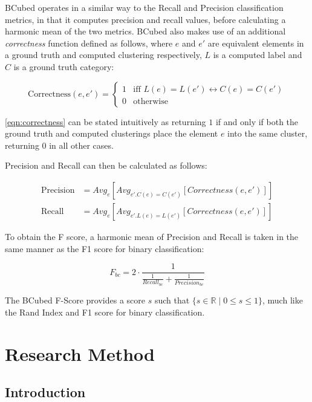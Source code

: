 \documentclass{uvamscse}	%
\begin{document}
	BCubed operates in a similar way to the Recall and Precision classification metrics, in that it computes precision and recall values, before calculating a harmonic mean of the two metrics. BCubed also makes use of an additional \emph{correctness} function defined as follows, where $e$ and $e'$ are equivalent elements in a ground truth and computed clustering respectively, $L$ is a computed label and $C$ is a ground truth category:
	
	\begin{equation}
	\label{eqn:correctness}
	    \text{Correctness}(e,e') = 
	    \begin{cases}
	        1 & \text{iff $L(e) = L(e') \leftrightarrow C(e) = C(e')$}\\
	        0 & \text{otherwise}
	    \end{cases}
	\end{equation}
	
	\autoref{eqn:correctness} can be stated intuitively as returning $1$ if and only if both the ground truth and computed clusterings place the element $e$ into the same cluster, returning $0$ in all other cases.
	
	Precision and Recall can then be calculated as follows:
	
    \begin{align}
    \label{eqn:bcubed-precision}
        \text{Precision} &= Avg_e [Avg_{e' . C(e) = C(e')}[Correctness(e,e')]]\\
        \label{eqn:bcubed-recall}
        \text{Recall} &= Avg_e [Avg_{e' . L(e) = L(e')}[Correctness(e,e')]]
    \end{align}

To obtain the F score, a harmonic mean of Precision and Recall is taken in the same manner as the F1 score for binary classification:

\begin{equation}
    F_{bc} = 2 \cdot \frac{1}{\frac{1}{Recall_{bc}} + \frac{1}{Precision_{bc}}}
\end{equation}

The BCubed F-Score provides a score $s$ such that $ \{s\in\mathbb{R} \mid 0\leq s \leq 1\} $, much like the Rand Index and F1 score for binary classification.

\chapter{Research Method}
\label{Research Method}

\section{Introduction}
\end{document}
